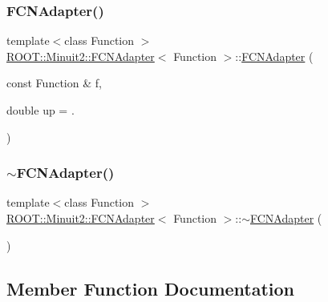 \subsubsection{\texorpdfstring{FCNAdapter()}{FCNAdapter()}\hspace{0.1cm}{\footnotesize\ttfamily [3/3]}}
{\footnotesize\ttfamily template$<$class Function $>$ \\
\mbox{\hyperlink{classROOT_1_1Minuit2_1_1FCNAdapter}{R\+O\+O\+T\+::\+Minuit2\+::\+F\+C\+N\+Adapter}}$<$ Function $>$\+::\mbox{\hyperlink{classROOT_1_1Minuit2_1_1FCNAdapter}{F\+C\+N\+Adapter}} (\begin{DoxyParamCaption}\item[{const Function \&}]{f,  }\item[{double}]{up = {.} }\end{DoxyParamCaption})\hspace{0.3cm}{\ttfamily [inline]}}

\mbox{\label{classROOT_1_1Minuit2_1_1FCNAdapter_a6d8b1c24b52ec333fca9cc854533a777}} 
\subsubsection{\texorpdfstring{$\sim$FCNAdapter()}{~FCNAdapter()}\hspace{0.1cm}{\footnotesize\ttfamily [3/3]}}
{\footnotesize\ttfamily template$<$class Function $>$ \\
\mbox{\hyperlink{classROOT_1_1Minuit2_1_1FCNAdapter}{R\+O\+O\+T\+::\+Minuit2\+::\+F\+C\+N\+Adapter}}$<$ Function $>$\+::$\sim$\mbox{\hyperlink{classROOT_1_1Minuit2_1_1FCNAdapter}{F\+C\+N\+Adapter}} (\begin{DoxyParamCaption}{ }\end{DoxyParamCaption})\hspace{0.3cm}{\ttfamily [inline]}}



\subsection{Member Function Documentation}
\mbox{\label{classROOT_1_1Minuit2_1_1FCNAdapter_a3d400764a6828594b68a00b905d450b2}} 

